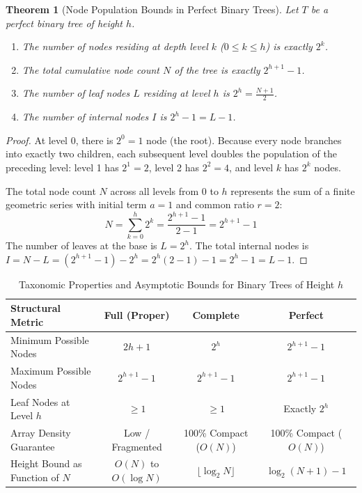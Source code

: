 \documentclass[10pt,journal,compsoc,onecolumn]{IEEEtran}
\newtheorem{theorem}{Theorem}
\begin{document}
\begin{theorem}[Node Population Bounds in Perfect Binary Trees]
Let $T$ be a perfect binary tree of height $h$.
\begin{enumerate}
    \item The number of nodes residing at depth level $k$ ($0 \le k \le h$) is exactly $2^k$.
    \item The total cumulative node count $N$ of the tree is exactly $2^{h+1} - 1$.
    \item The number of leaf nodes $L$ residing at level $h$ is $2^h = \frac{N + 1}{2}$.
    \item The number of internal nodes $I$ is $2^h - 1 = L - 1$.
\end{enumerate}
\end{theorem}
\begin{proof}
At level $0$, there is $2^0 = 1$ node (the root). Because every node branches into exactly two children, each subsequent level doubles the population of the preceding level: level 1 has $2^1 = 2$, level 2 has $2^2 = 4$, and level $k$ has $2^k$ nodes.

The total node count $N$ across all levels from $0$ to $h$ represents the sum of a finite geometric series with initial term $a = 1$ and common ratio $r = 2$:
\begin{equation}
    N = \sum_{k=0}^{h} 2^k = \frac{2^{h+1} - 1}{2 - 1} = 2^{h+1} - 1
\end{equation}
The number of leaves at the base is $L = 2^h$. The total internal nodes is $I = N - L = (2^{h+1} - 1) - 2^h = 2^h(2 - 1) - 1 = 2^h - 1 = L - 1$.
\end{proof}

\begin{table}[htbp]
\centering
\caption{Taxonomic Properties and Asymptotic Bounds for Binary Trees of Height $h$}
\label{tab:tree_classification_bounds}
\begin{tabular}{lccc}
\toprule
\textbf{Structural Metric} & \textbf{Full (Proper)} & \textbf{Complete} & \textbf{Perfect} \\
\midrule
Minimum Possible Nodes & $2h + 1$ & $2^h$ & $2^{h+1} - 1$ \\
Maximum Possible Nodes & $2^{h+1} - 1$ & $2^{h+1} - 1$ & $2^{h+1} - 1$ \\
Leaf Nodes at Level $h$ & $\ge 1$ & $\ge 1$ & Exactly $2^h$ \\
Array Density Guarantee & Low / Fragmented & 100\% Compact ($O(N)$) & 100\% Compact ($O(N)$) \\
Height Bound as Function of $N$ & $O(N)$ to $O(\log N)$ & $\lfloor \log_2 N \rfloor$ & $\log_2(N + 1) - 1$ \\
\bottomrule
\end{tabular}
\end{table}
\end{document}
